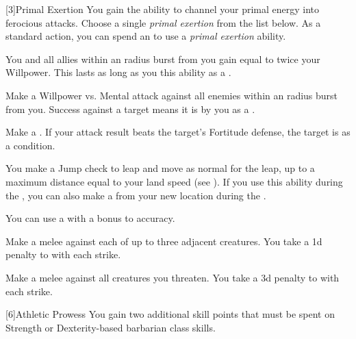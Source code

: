             [3]{Primal Exertion}
            You gain the ability to channel your primal energy into ferocious attacks.
            Choose a single \textit{primal exertion} from the list below.
            As a standard action, you can spend an  to use a \textit{primal exertion} ability.
            {
                 You and all allies within an \arealarge radius burst from you gain  equal to twice your Willpower.
                This lasts as long as you  this ability as a .

                Make a Willpower vs. Mental attack against all enemies within an \arealarge radius burst from you.
                Success against a target means it is \shaken by you as a .

                 Make a .
                If your attack result beats the target's Fortitude defense, the target is \sickened as a condition.

                 You make a Jump check to leap and move as normal for the leap, up to a maximum distance equal to your land speed (see ).
                If you use this ability during the , you can also make a  from your new location during the .

                 You can use a  with a  bonus to accuracy.

                 Make a melee  against each of up to three adjacent creatures.
                You take a \minus1d penalty to  with each strike.

                 Make a melee  against all creatures you threaten.
                You take a \minus3d penalty to  with each strike.
            }

            [6]{Athletic Prowess} You gain two additional skill points that must be spent on Strength or Dexterity-based barbarian class skills.

